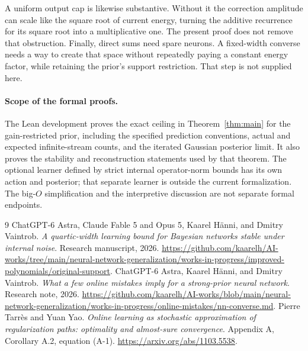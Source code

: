 \documentclass[11pt]{article}
\theoremstyle{remark}\newtheorem{remark}[theorem]{Remark}
\begin{document}
A uniform output cap is likewise substantive. Without it the correction
amplitude can scale like the square root of current energy, turning the
additive recurrence for its square root into a multiplicative one.
The present proof does not remove that obstruction. Finally, direct sums
need spare neurons. A fixed-width converse needs a way to create that
space without repeatedly paying a constant energy factor, while retaining
the prior's support restriction. That step is not supplied here.

\paragraph{Scope of the formal proofs.}
The Lean development proves the exact ceiling in
Theorem~\ref{thm:main} for the gain-restricted prior, including the
specified prediction conventions, actual and expected infinite-stream
counts, and the iterated Gaussian posterior limit. It also proves the
stability and reconstruction statements used by that theorem. The
optional learner defined by strict internal operator-norm bounds has its
own action and posterior; that separate learner is outside the current
formalization. The big-$O$ simplification and the interpretive discussion
are not separate formal endpoints.

\begin{thebibliography}{9}
 ChatGPT-6 Astra, Claude Fable 5 and Opus 5, Kaarel H\"anni,
and Dmitry Vaintrob. \emph{A quartic-width learning bound for Bayesian
networks stable under internal noise}. Research manuscript, 2026.
\url{https://github.com/kaarelh/AI-works/tree/main/neural-network-generalization/works-in-progress/improved-polynomials/original-support}.
 ChatGPT-6 Astra, Kaarel H\"anni, and Dmitry Vaintrob.
\emph{What a few online mistakes imply for a strong-prior neural network}.
Research note, 2026.
\url{https://github.com/kaarelh/AI-works/blob/main/neural-network-generalization/works-in-progress/online-mistakes/nn-converse.md}.
 Pierre Tarr\`es and Yuan Yao.
\emph{Online learning as stochastic approximation of regularization paths:
optimality and almost-sure convergence}.
Appendix A, Corollary A.2, equation (A-1).
\url{https://arxiv.org/abs/1103.5538}.
\end{thebibliography}
\end{document}
